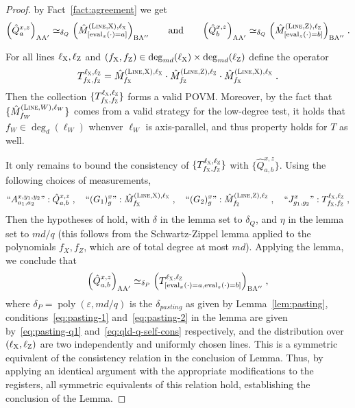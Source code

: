 \documentclass[11pt]{article}
\theoremstyle{definition}
\DeclareMathOperator{\poly}{poly}
\newcommand{\eps}{\varepsilon}
\newcommand{\labelstyle}[1]{\ensuremath{\textsc{#1}}\xspace}
\newcommand{\xpt}{\labelstyle{X}}
\newcommand{\zpt}{\labelstyle{Z}}
\newcommand{\alice}{\labelstyle{A}}
\newcommand{\bob}{\labelstyle{B}}
\newcommand{\typestyle}[1]{\ensuremath{\textsc{#1}}\xspace}
\renewcommand{\line}{\mathbf{\ell}}
\newcommand{\Line}{\typestyle{Line}}
\newcommand{\eval}{\mathrm{eval}}
\begin{document}
\begin{proof}
	by Fact~\ref{fact:agreement} we get
	\begin{align}\label{eq:pasting-q1}
		\Big ( \hat{Q}^{x,z}_{a} \Big)_{\alice \alice'} \simeq_{\delta_Q} \Big (\hat{M}^{(\Line,\xpt),\line_\xpt}_{[\eval_x(\cdot) = a]} \Big)_{\bob \alice''} \qquad \text{and} \qquad \Big ( \hat{Q}^{x,z}_{b} \Big)_{\alice \alice'} \simeq_{\delta_Q} \Big (\hat{M}^{(\Line,\zpt),\line_\zpt}_{[\eval_z(\cdot) = b]} \Big )_{\bob \alice''} \;.
	\end{align}

	For all lines $\line_\xpt,\line_\zpt$ and $(f_\xpt,f_\zpt) \in \deg_{md}(\line_\xpt) \times \deg_{md}(\line_\zpt)$ define the operator
	\[
		T^{\line_\xpt,\line_\zpt}_{f_\xpt,f_\zpt} = \hat{M}^{(\Line,\xpt),\line_\xpt}_{f_\xpt} \cdot \hat{M}^{(\Line,\zpt),\line_\zpt}_{f_\zpt}  \cdot \hat{M}^{(\Line,\xpt),\line_\xpt}_{f_\xpt} \;.
	\]
	Then the collection $\{ T^{\line_\xpt,\line_\zpt}_{f_\xpt,f_\zpt} \}$ forms a valid POVM. Moreover, by the fact that $\{\hat{M}^{(\Line, W), \line_W}_{f_W}\}$ comes from a valid strategy for the low-degree test, it holds that $f_W \in \deg_{d}(\line_W)$ whenver $\line_W$ is axis-parallel, and thus property holds for $T$ as well. 

        It only remains to bound the consistency of $\{T^{\line_\xpt, \line_\zpt}_{f_\xpt, f_\zpt}\}$ with $\{\hat{Q}^{x,z}_{a,b}\}$. Using the following choices of measurements,
	\begin{equation*}
		``A^{x,y_1,y_2}_{a_1,a_2}" : \hat{Q}^{x,z}_{a,b} \;, \quad
		``(G_1)^x_g" : \hat{M}^{(\Line,\xpt),\line_\xpt}_{f_\xpt} \;, \quad
		``(G_2)^x_g" : \hat{M}^{(\Line,\zpt),\line_\zpt}_{f_\zpt} \;, \quad
		``J^x_{g_1,g_2}": T^{\line_\xpt,\line_\zpt}_{f_\xpt,f_\zpt} \;,
              \end{equation*}
	Then the hypotheses of  hold, with $\delta$ in the lemma set to $\delta_Q$, and $\eta$ in the lemma set to $md/q$ (this follows from the Schwartz-Zippel lemma applied to the polynomials $f_X, f_Z$, which are of total degree at most $md$). Applying the lemma, we conclude that
	\begin{equation}
	\label{eq:qld-4-13-1}
		\Big( \hat{Q}^{x,z}_{a,b} \Big)_{\alice \alice'} \simeq_{\delta_P} \Big( T^{\line_\xpt,\line_\zpt}_{[\eval_x(\cdot) = a, \eval_z(\cdot) = b]} \Big)_{\bob \alice''}\;,
	\end{equation}
	where $\delta_P = \poly(\eps,md/q)$ is the $\delta_{pasting}$ as given by Lemma~\ref{lem:pasting}, conditions~\eqref{eq:pasting-1} and~\eqref{eq:pasting-2} in the lemma are given by~\eqref{eq:pasting-q1} and~\eqref{eq:qld-q-self-cons} respectively, 
	and the distribution over $(\ell_\xpt,\ell_\zpt)$ are two independently and uniformly chosen lines. This is a symmetric equivalent of the consistency relation in the conclusion of Lemma. Thus, by applying an identical argument with the appropriate modifications to the registers, all symmetric equivalents of this relation hold, establishing the conclusion of the Lemma.



\end{proof}
\end{document}
